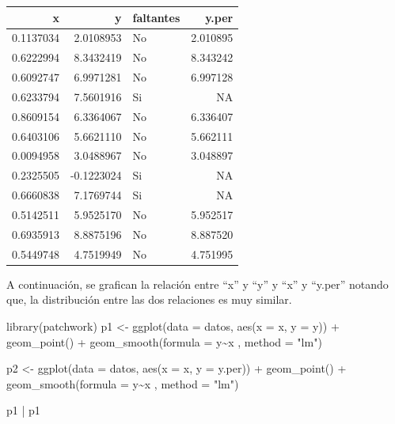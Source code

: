 \documentclass[
  12pt,
]{book}
\newenvironment{Shaded}{\begin{snugshade}}{\end{snugshade}}
\newcommand{\AttributeTok}[1]{\textcolor[rgb]{0.77,0.63,0.00}{#1}}
\newcommand{\FunctionTok}[1]{\textcolor[rgb]{0.00,0.00,0.00}{#1}}
\newcommand{\NormalTok}[1]{#1}
\newcommand{\OtherTok}[1]{\textcolor[rgb]{0.56,0.35,0.01}{#1}}
\newcommand{\SpecialCharTok}[1]{\textcolor[rgb]{0.00,0.00,0.00}{#1}}
\newcommand{\StringTok}[1]{\textcolor[rgb]{0.31,0.60,0.02}{#1}}
\begin{document}
\begin{tabular}{r|r|l|r}
\hline
x & y & faltantes & y.per\\
\hline
0.1137034 & 2.0108953 & No & 2.010895\\
\hline
0.6222994 & 8.3432419 & No & 8.343242\\
\hline
0.6092747 & 6.9971281 & No & 6.997128\\
\hline
0.6233794 & 7.5601916 & Si & NA\\
\hline
0.8609154 & 6.3364067 & No & 6.336407\\
\hline
0.6403106 & 5.6621110 & No & 5.662111\\
\hline
0.0094958 & 3.0488967 & No & 3.048897\\
\hline
0.2325505 & -0.1223024 & Si & NA\\
\hline
0.6660838 & 7.1769744 & Si & NA\\
\hline
0.5142511 & 5.9525170 & No & 5.952517\\
\hline
0.6935913 & 8.8875196 & No & 8.887520\\
\hline
0.5449748 & 4.7519949 & No & 4.751995\\
\hline
\end{tabular}

A continuación, se grafican la relación entre ``x'' y ``y'' y ``x'' y ``y.per'' notando que, la distribución entre las dos relaciones es muy similar.

\begin{Shaded}
\begin{Highlighting}[]
\FunctionTok{library}\NormalTok{(patchwork)}
\NormalTok{p1 }\OtherTok{\textless{}{-}} \FunctionTok{ggplot}\NormalTok{(}\AttributeTok{data =}\NormalTok{ datos, }\FunctionTok{aes}\NormalTok{(}\AttributeTok{x =}\NormalTok{ x, }\AttributeTok{y =}\NormalTok{ y)) }\SpecialCharTok{+}
  \FunctionTok{geom\_point}\NormalTok{() }\SpecialCharTok{+} \FunctionTok{geom\_smooth}\NormalTok{(}\AttributeTok{formula =}\NormalTok{ y}\SpecialCharTok{\textasciitilde{}}\NormalTok{x , }\AttributeTok{method =} \StringTok{"lm"}\NormalTok{)}

\NormalTok{p2 }\OtherTok{\textless{}{-}} \FunctionTok{ggplot}\NormalTok{(}\AttributeTok{data =}\NormalTok{ datos, }\FunctionTok{aes}\NormalTok{(}\AttributeTok{x =}\NormalTok{ x, }\AttributeTok{y =}\NormalTok{ y.per)) }\SpecialCharTok{+}
  \FunctionTok{geom\_point}\NormalTok{() }\SpecialCharTok{+} \FunctionTok{geom\_smooth}\NormalTok{(}\AttributeTok{formula =}\NormalTok{ y}\SpecialCharTok{\textasciitilde{}}\NormalTok{x , }\AttributeTok{method =} \StringTok{"lm"}\NormalTok{)}
  
\NormalTok{p1 }\SpecialCharTok{|}\NormalTok{ p1}
\end{Highlighting}
\end{Shaded}
\end{document}
